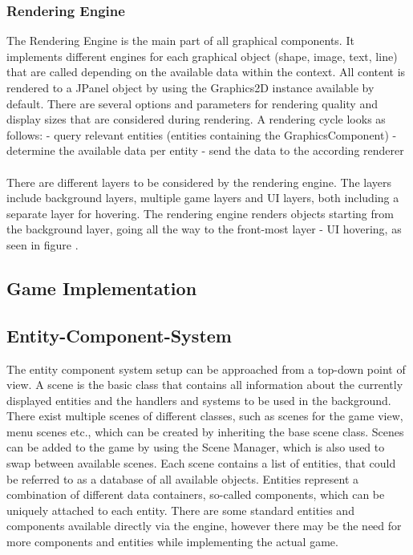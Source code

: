 \subsubsection{Rendering Engine}\label{subsubsec:graphics-engine}
The Rendering Engine is the main part of all graphical components.
It implements different engines for each graphical object (shape, image, text, line) that are called depending on the available data within the
context.
All content is rendered to a JPanel object by using the Graphics2D instance available by default.
There are several options and parameters for rendering quality and display sizes that are considered during rendering.
A rendering cycle looks as follows:
- query relevant entities (entities containing the GraphicsComponent)
- determine the available data per entity
- send the data to the according renderer
\\ \\
There are different layers to be considered by the rendering engine.
The layers include background layers, multiple game layers and UI layers, both including a separate layer for hovering.
The rendering engine renders objects starting from the background layer, going all the way to the front-most layer - UI hovering, as seen in figure
.

\subsection{Game Implementation}\label{subsec:game-implementation}

\subsection{Entity-Component-System}\label{subsec:entity-component-system}
The entity component system setup can be approached from a top-down point of view.
A scene is the basic class that contains all information about the currently displayed entities and the handlers and systems to be used
in the background.
There exist multiple scenes of different classes, such as scenes for the game view, menu scenes etc., which can be created by
inheriting the base scene class.
Scenes can be added to the game by using the Scene Manager, which is also used to swap between available scenes.
Each scene contains a list of entities, that could be referred to as a database of all available objects.
Entities represent a combination of different data containers, so-called components, which can be uniquely attached to each entity.
There are some standard entities and components available directly via the engine, however there may be the need for more components and entities while implementing the actual game.

